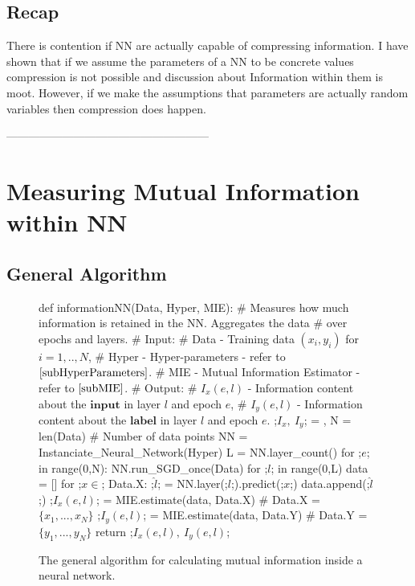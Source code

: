 \documentclass[dissertation.tex]{subfiles}
\begin{document}
\subsection{Recap}

There is contention if NN are actually capable of compressing information. 
I have shown that if we assume the parameters of a NN to be concrete values
compression is not possible and discussion about Information within them is
moot. However, if we make the assumptions that parameters are actually random
variables then compression does happen.

------------------------------------------------------

\section{Measuring Mutual Information within NN}

\subsection{General Algorithm}

\begin{figure}[H]
    \begin{pythonfigure}
      def informationNN(Data, Hyper, MIE):
      # Measures how much information is retained in the NN. Aggregates the data
      # over epochs and layers.
      # Input:
      # Data  - Training data $(x_i, y_i)$ for $i=1,..,N$,
      # Hyper - Hyper-parameters - refer to $\autoref{subHyperParameters}$.
      # MIE   - Mutual Information Estimator - refer to $\autoref{subMIE}$.
      # Output:
      # $I_x(e, l)$ - Information content about the $\textbf{input}$ in layer $l$ and epoch $e$,
      # $I_y(e, l)$ - Information content about the $\textbf{label}$  in layer $l$ and epoch $e$.
      ;$I_x,\ I_y$; = {}, {}
      N = len(Data) # Number of data points
      NN = Instanciate_Neural_Network(Hyper)
      L = NN.layer_count()
      for ;$e$; in range(0,N):
        NN.run_SGD_once(Data)
        for ;$l$; in range(0,L)
          data = []
          for ;$x\in$; Data.X:
            ;$\hat{l}$; = NN.layer(;$l$;).predict(;$x$;)
            data.append(;$\hat{l}$;)
          ;$I_x(e,l)$; = MIE.estimate(data, Data.X) # Data.X = $\{x_1,...,x_N\}$
          ;$I_y(e,l)$; = MIE.estimate(data, Data.Y) # Data.Y = $\{y_1,...,y_N\}$
      return ;$I_x(e,l),\ I_y(e,l)$;
    \end{pythonfigure}
    \caption{The general algorithm for calculating mutual information inside a
    neural network.}
    \label{figGeneral}
\end{figure}
\end{document}

